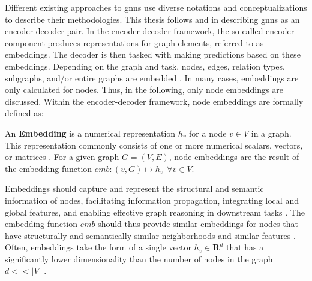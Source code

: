 Different existing approaches to \glspl{gnn} use diverse notations and conceptualizations to describe their methodologies. This thesis follows \cite{hamilton_representation_2017} and \cite{kazemi_representation_2019} in describing \glspl{gnn} as an encoder-decoder pair.
In the encoder-decoder framework, the so-called encoder component produces representations for graph elements, referred to as embeddings. The decoder is then tasked with making predictions based on these embeddings. Depending on the graph and task, nodes, edges, relation types, subgraphs, and/or entire graphs are embedded \cite{barros_survey_2023}. In many cases, embeddings are only calculated for nodes. Thus, in the following, only node embeddings are discussed. Within the encoder-decoder framework, node embeddings are formally defined as: 

\begin{definition}
    \label{d_Embedding}
    An \textbf{Embedding} is a numerical representation $h_v$ for a node $v \in V$ in a graph. This representation commonly consists of one or more numerical scalars, vectors, or matrices \cite{kazemi_representation_2019}. For a given graph $G = (V, E)$, node embeddings are the result of the embedding function $emb: (v, G) \mapsto h_v \hspace{5pt} \forall v \in V$.
\end{definition}

Embeddings should capture and represent the structural and semantic information of nodes, facilitating information propagation, integrating local and global features, and enabling effective graph reasoning in downstream tasks \cite{goyal_graph_2018}. The embedding function $emb$ should thus provide similar embeddings for nodes that have structurally and semantically similar neighborhoods and similar features \cite{goyal_graph_2018, bronstein_geometric_2021}.
Often, embeddings take the form of a single vector $h_v \in \mathbf{R}^d$ that has a significantly lower dimensionality than the number of nodes in the graph $d<<|V|$ \cite{goyal_graph_2018}. 


